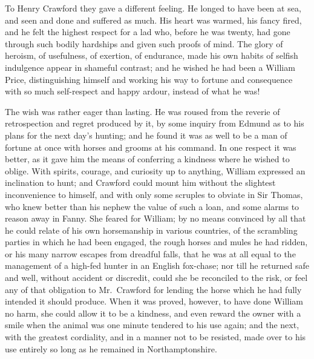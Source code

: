 To Henry Crawford they gave a different feeling.  He longed
to have been at sea, and seen and done and suffered as much.
His heart was warmed, his fancy fired, and he felt
the highest respect for a lad who, before he was twenty,
had gone through such bodily hardships and given such
proofs of mind.  The glory of heroism, of usefulness,
of exertion, of endurance, made his own habits of selfish
indulgence appear in shameful contrast; and he wished
he had been a William Price, distinguishing himself and
working his way to fortune and consequence with so much
self-respect and happy ardour, instead of what he was!

The wish was rather eager than lasting.  He was roused from
the reverie of retrospection and regret produced by it,
by some inquiry from Edmund as to his plans for the next
day's hunting; and he found it was as well to be a man
of fortune at once with horses and grooms at his command.
In one respect it was better, as it gave him the means
of conferring a kindness where he wished to oblige.
With spirits, courage, and curiosity up to anything,
William expressed an inclination to hunt; and Crawford could
mount him without the slightest inconvenience to himself,
and with only some scruples to obviate in Sir Thomas,
who knew better than his nephew the value of such a loan,
and some alarms to reason away in Fanny.  She feared
for William; by no means convinced by all that he could
relate of his own horsemanship in various countries,
of the scrambling parties in which he had been engaged,
the rough horses and mules he had ridden, or his many narrow
escapes from dreadful falls, that he was at all equal to the
management of a high-fed hunter in an English fox-chase;
nor till he returned safe and well, without accident
or discredit, could she be reconciled to the risk,
or feel any of that obligation to Mr.\ Crawford for lending
the horse which he had fully intended it should produce.
When it was proved, however, to have done William no harm,
she could allow it to be a kindness, and even reward
the owner with a smile when the animal was one minute
tendered to his use again; and the next, with the
greatest cordiality, and in a manner not to be resisted,
made over to his use entirely so long as he remained
in Northamptonshire.




